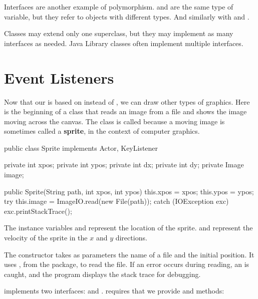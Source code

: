 Interfaces are another example of polymorphism.
 and  are the same type of variable, but they refer to objects with different types.
And similarly with  and .


Classes may extend only one superclass, but they may implement as many interfaces as needed.
Java Library classes often implement multiple interfaces.


\section{Event Listeners}


Now that our  is based on  instead of , we can draw other types of graphics.
Here is the beginning of a class that reads an image from a file and shows the image moving across the canvas.
The class is called  because a moving image is sometimes called a {\bf sprite}, in the context of computer graphics.

\begin{code}
public class Sprite implements Actor, KeyListener {
    private int xpos;
    private int ypos;
    private int dx;
    private int dy;
    private Image image;

    public Sprite(String path, int xpos, int ypos) {
        this.xpos = xpos;
        this.ypos = ypos;
        try {
            this.image = ImageIO.read(new File(path));
        } catch (IOException exc) {
            exc.printStackTrace();
        }
    }
}
\end{code}

The instance variables  and  represent the location of the sprite.
 and  represent the velocity of the sprite in the $x$ and $y$ directions.

The constructor takes as parameters the name of a file and the initial position.
It uses  , from the  package, to read the file.
If an error occurs during reading, an  is caught, and the program displays the stack trace for debugging.

 implements two interfaces:  and .
 requires that we provide  and  methods:

